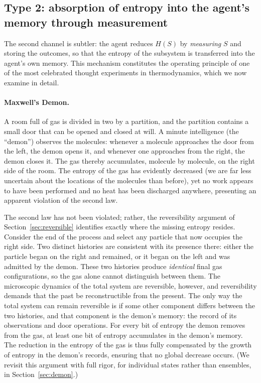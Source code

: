 \documentclass[10pt]{article}
\theoremstyle{definition}
\theoremstyle{remark}
\begin{document}
\subsection{Type 2: absorption of entropy into the agent's memory through measurement}
\label{sec:type2}

The second channel is subtler: the agent reduces $H(S)$ by \emph{measuring} $S$ and storing the outcomes, so that the entropy of the subsystem is transferred into the agent's own memory. This mechanism constitutes the operating principle of one of the most celebrated thought experiments in thermodynamics, which we now examine in detail.

\paragraph{Maxwell's Demon.} A room full of gas is divided in two by a partition, and the partition contains a small door that can be opened and closed at will. A minute intelligence (the ``demon'') observes the molecules: whenever a molecule approaches the door from the left, the demon opens it, and whenever one approaches from the right, the demon closes it. The gas thereby accumulates, molecule by molecule, on the right side of the room. The entropy of the gas has evidently decreased (we are far less uncertain about the locations of the molecules than before), yet no work appears to have been performed and no heat has been discharged anywhere, presenting an apparent violation of the second law.

The second law has not been violated; rather, the reversibility argument of Section~\ref{sec:reversible} identifies exactly where the missing entropy resides. Consider the end of the process and select any particle that now occupies the right side. Two distinct histories are consistent with its presence there: either the particle began on the right and remained, or it began on the left and was admitted by the demon. These two histories produce \emph{identical} final gas configurations, so the gas alone cannot distinguish between them. The microscopic dynamics of the total system are reversible, however, and reversibility demands that the past be reconstructible from the present. The only way the total system can remain reversible is if some other component differs between the two histories, and that component is the demon's memory: the record of its observations and door operations. For every bit of entropy the demon removes from the gas, at least one bit of entropy accumulates in the demon's memory. The reduction in the entropy of the gas is thus fully compensated by the growth of entropy in the demon's records, ensuring that no global decrease occurs. (We revisit this argument with full rigor, for individual states rather than ensembles, in Section~\ref{sec:demon}.)
\end{document}
